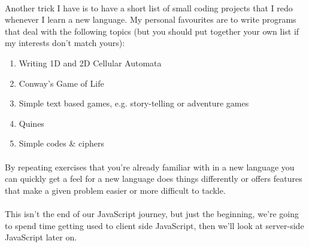 \documentclass[10pt, a4paper, twosize]{article}
\begin{document}
\paragraph{} Another trick I have is to have a short list of small coding projects that I redo whenever I learn a new language. My personal favourites are to write programs that deal with the following topics (but you should put together your own list if my interests don't match yours):
\begin{enumerate}
\item Writing 1D and 2D Cellular Automata
\item Conway's Game of Life
\item Simple text based games, e.g. story-telling or adventure games
\item Quines
\item Simple codes \& ciphers
\end{enumerate}

\paragraph{} By repeating exercises that you're already familiar with in a new language you can quickly get a feel for a new language does things differently or offers features that make a given problem easier or more difficult to tackle.

\paragraph{} This isn't the end of our JavaScript journey, but just the beginning, we're going to spend time getting used to client side JavaScript, then we'll look at server-side JavaScript later on.
\end{document}
